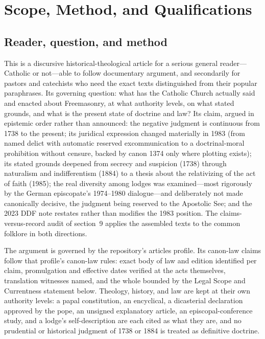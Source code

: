 \section{Scope, Method, and Qualifications}

\subsection{Reader, question, and method}

This is a discursive historical-theological article for a serious general reader---Catholic or not---able to follow documentary argument, and secondarily for pastors and catechists who need the exact texts distinguished from their popular paraphrases. Its governing question: what has the Catholic Church actually said and enacted about Freemasonry, at what authority levels, on what stated grounds, and what is the present state of doctrine and law? Its claim, argued in epistemic order rather than announced: the negative judgment is continuous from 1738 to the present; its juridical expression changed materially in 1983 (from named delict with automatic reserved excommunication to a doctrinal-moral prohibition without censure, backed by canon 1374 only where plotting exists); its stated grounds deepened from secrecy and suspicion (1738) through naturalism and indifferentism (1884) to a thesis about the relativizing of the act of faith (1985); the real diversity among lodges was examined---most rigorously by the German episcopate's 1974--1980 dialogue---and deliberately not made canonically decisive, the judgment being reserved to the Apostolic See; and the 2023 DDF note restates rather than modifies the 1983 position. The claims-versus-record audit of section~9 applies the assembled texts to the common folklore in both directions.

The argument is governed by the repository's articles profile. Its canon-law claims follow that profile's canon-law rules: exact body of law and edition identified per claim, promulgation and effective dates verified at the acts themselves, translation witnesses named, and the whole bounded by the Legal Scope and Currentness statement below. Theology, history, and law are kept at their own authority levels: a papal constitution, an encyclical, a dicasterial declaration approved by the pope, an unsigned explanatory article, an episcopal-conference study, and a lodge's self-description are each cited as what they are, and no prudential or historical judgment of 1738 or 1884 is treated as definitive doctrine.

